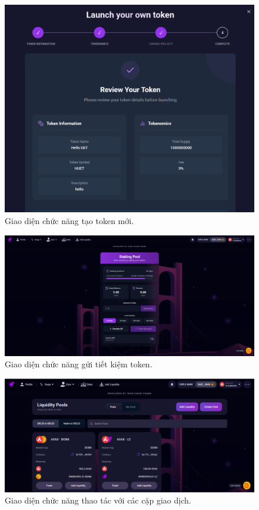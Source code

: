\begin{figure}[H]
  \centering
  \includegraphics[width=1\textwidth]{figures/c3/CreateTokenRel.png}
  \caption{Giao diện chức năng tạo token mới.}
  \label{fig:architecture-diagram}
\end{figure}

\begin{figure}[H]
  \centering
  \includegraphics[width=1\textwidth]{figures/c3/StakingRel.png}
  \caption{Giao diện chức năng gửi tiết kiệm token.}
  \label{fig:architecture-diagram}
\end{figure}

\begin{figure}[H]
  \centering
  \includegraphics[width=1\textwidth]{figures/c3/SwapRel.png}
  \caption{Giao diện chức năng thao tác với các cặp giao dịch.}
  \label{fig:architecture-diagram}
\end{figure}

